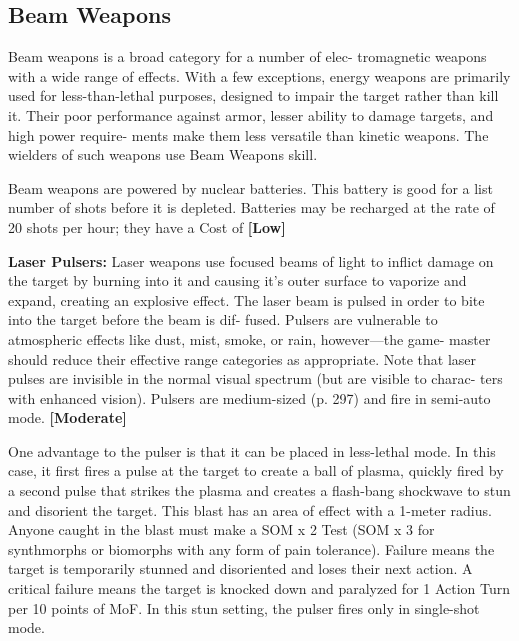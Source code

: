 \subsection{Beam Weapons}

Beam weapons is a broad category for a number of elec-
tromagnetic weapons with a wide range of effects. With 
a few exceptions, energy weapons are primarily used for 
less-than-lethal purposes, designed to impair the target 
rather than kill it. Their poor performance against armor, 
lesser ability to damage targets, and high power require-
ments make them less versatile than kinetic weapons. 
The wielders of such weapons use Beam Weapons skill.

Beam weapons are powered by nuclear batteries. 
This battery is good for a list number of shots before 
it is depleted. Batteries may be recharged at the rate of 
20 shots per hour; they have a Cost of \textbf{[Low]}

\textbf{Laser Pulsers: }Laser weapons use focused beams of 
light to inflict damage on the target by burning into it 
and causing it's outer surface to vaporize and expand, 
creating an explosive effect. The laser beam is pulsed 
in order to bite into the target before the beam is dif-
fused. Pulsers are vulnerable to atmospheric effects 
like dust, mist, smoke, or rain, however—the game-
master should reduce their effective range categories 
as appropriate. Note that laser pulses are invisible in 
the normal visual spectrum (but are visible to charac-
ters with enhanced vision). Pulsers are medium-sized 
(p. 297) and fire in semi-auto mode. \textbf{[Moderate]}

One advantage to the pulser is that it can be placed 
in less-lethal mode. In this case, it first fires a pulse at 
the target to create a ball of plasma, quickly fired by 
a second pulse that strikes the plasma and creates a 
flash-bang shockwave to stun and disorient the target. 
This blast has an area of effect with a 1-meter radius. 
Anyone caught in the blast must make a SOM x 2 
Test (SOM x 3 for synthmorphs or biomorphs with 
any form of pain tolerance). Failure means the target 
is temporarily stunned and disoriented and loses 
their next action. A critical failure means the target 
is knocked down and paralyzed for 1 Action Turn per 
10 points of MoF. In this stun setting, the pulser fires 
only in single-shot mode.

